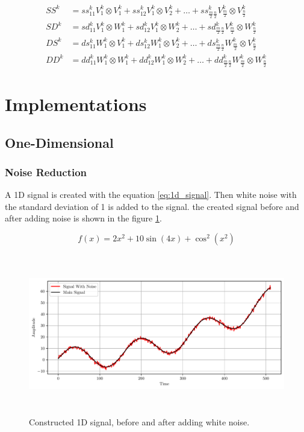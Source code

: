 \documentclass[12pt]{article}
\begin{document}
	\begin{equation}
		\begin{aligned}
		SS^k &= ss_{11}^k V_1^k \otimes V_1^k + ss_{12}^k V_1^k \otimes V_2^k + \dots + ss_{\frac{m}{2}\frac{n}{2}}^k V_{\frac{m}{2}}^k \otimes V_{\frac{n}{2}}^k \\
		SD^k &= sd_{11}^k V_1^k \otimes W_1^k + sd_{12}^k V_1^k \otimes W_2^k + \dots + sd_{\frac{m}{2}\frac{n}{2}}^k V_{\frac{m}{2}}^k \otimes W_{\frac{n}{2}}^k \\
		DS^k &= ds_{11}^k W_1^k \otimes V_1^k + ds_{12}^k W_1^k \otimes V_2^k + \dots + ds_{\frac{m}{2}\frac{n}{2}}^k W_{\frac{m}{2}}^k \otimes V_{\frac{n}{2}}^k \\
		DD^k &= dd_{11}^k W_1^k \otimes W_1^k + dd_{12}^k W_1^k \otimes W_2^k + \dots + dd_{\frac{m}{2}\frac{n}{2}}^k W_{\frac{m}{2}}^k \otimes W_{\frac{n}{2}}^k
		\end{aligned}
		\label{eq:2d_parts_n}
	\end{equation}
	
	\section{Implementations}
	
	\subsection{One-Dimensional}
	
	\subsubsection{Noise Reduction}
	
	A 1D signal is created with the equation \ref{eq:1d_signal}. Then white noise with the standard deviation of 1 is added to the signal. the created signal before and after adding noise is shown in the figure \ref{fig:1d_signal}.
	
	\begin{equation}
		f(x)=2x^2 + 10\sin(4x) + \cos^2(x^2)
		\label{eq:1d_signal}
	\end{equation}
	
	\begin{figure}[!h]
		\centering
		\includegraphics[height=7cm]{../Tests/Outputs/1D_Signal.pdf}
		\caption{Constructed 1D signal, before and after adding white noise.}
		\label{fig:1d_signal}
	\end{figure}
	
\end{document}
